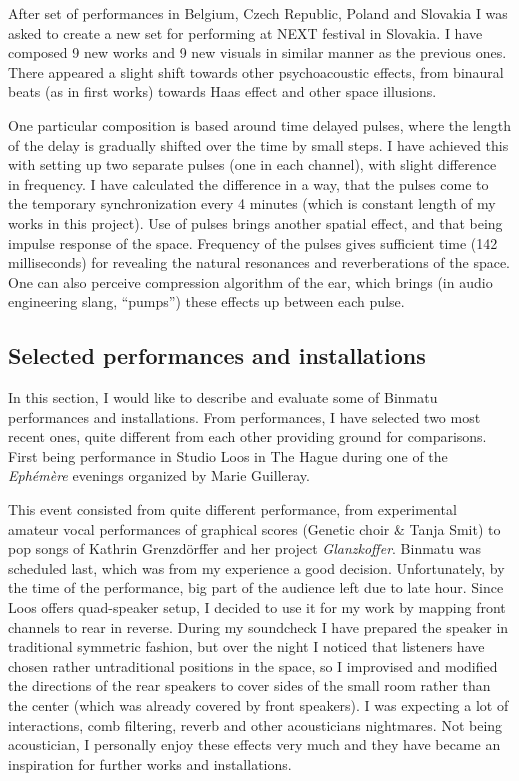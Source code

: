 \documentclass[12pt,a4paper,oneside]{report}
\begin{document}
After set of performances in Belgium, Czech Republic, Poland and Slovakia I was asked to create a new set for performing at NEXT festival in Slovakia. I have composed 9 new works and 9 new visuals in similar manner as the previous ones. There appeared a slight shift towards other psychoacoustic effects, from binaural beats (as in first works) towards Haas effect and other space illusions.

One particular composition is based around time delayed pulses, where the length of the delay is gradually shifted over the time by small steps. I have achieved this with setting up two separate pulses (one in each channel), with slight difference in frequency. I have calculated the difference in a way, that the pulses come to the temporary synchronization every 4 minutes (which is constant length of my works in this project). Use of pulses brings another spatial effect, and that being impulse response of the space. Frequency of the pulses gives sufficient time (142 milliseconds) for revealing the natural resonances and reverberations of the space. One can also perceive compression algorithm of the ear, which brings (in audio engineering slang, ``pumps'') these effects up between each pulse.

\subsection{Selected performances and installations} In this section, I would like to describe and evaluate some of Binmatu performances and installations. From performances, I have selected two most recent ones, quite different from each other providing ground for comparisons. First being performance in Studio Loos in The Hague during one of the \emph{Ephémère} evenings organized by Marie Guilleray. 

This event consisted from quite different performance, from experimental amateur vocal performances of graphical scores (Genetic choir \& Tanja Smit) to pop songs of Kathrin Grenzdörffer and her project \emph{Glanzkoffer}. Binmatu was scheduled last, which was from my experience a good decision. Unfortunately, by the time of the performance, big part of the audience left due to late hour. Since Loos offers quad-speaker setup, I decided to use it for my work by mapping front channels to rear in reverse. During my soundcheck I have prepared the speaker in traditional symmetric fashion, but over the night I noticed that listeners have chosen rather untraditional positions in the space, so I improvised and modified the directions of the rear speakers to cover sides of the small room rather than the center (which was already covered by front speakers). I was expecting a lot of interactions, comb filtering, reverb and other acousticians nightmares. Not being acoustician, I personally enjoy these effects very much and they have became an inspiration for further works and installations. 
\end{document}
